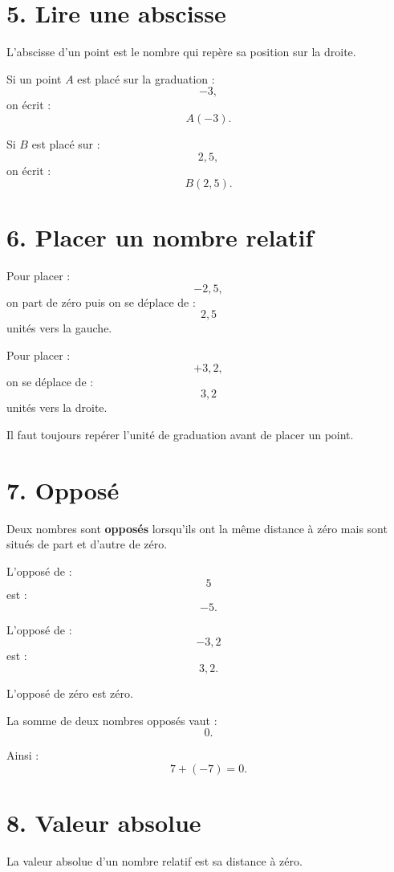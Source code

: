 \section{5. Lire une abscisse}

L'abscisse d'un point est le nombre qui repère sa position sur la droite.

Si un point $A$ est placé sur la graduation :
\[
-3,
\]
on écrit :
\[
A(-3).
\]

Si $B$ est placé sur :
\[
2{,}5,
\]
on écrit :
\[
B(2{,}5).
\]

\section{6. Placer un nombre relatif}

Pour placer :
\[
-2{,}5,
\]
on part de zéro puis on se déplace de :
\[
2{,}5
\]
unités vers la gauche.

Pour placer :
\[
+3{,}2,
\]
on se déplace de :
\[
3{,}2
\]
unités vers la droite.

Il faut toujours repérer l'unité de graduation avant de placer un point.

\section{7. Opposé}

\begin{definition}
Deux nombres sont \textbf{opposés} lorsqu'ils ont la même distance à zéro mais sont situés de part et d'autre de zéro.
\end{definition}

L'opposé de :
\[
5
\]
est :
\[
-5.
\]

L'opposé de :
\[
-3{,}2
\]
est :
\[
3{,}2.
\]

L'opposé de zéro est zéro.

\begin{propriete}
La somme de deux nombres opposés vaut :
\[
0.
\]
\end{propriete}

Ainsi :
\[
7+(-7)=0.
\]

\section{8. Valeur absolue}

\begin{definition}
La valeur absolue d'un nombre relatif est sa distance à zéro.
\end{definition}

